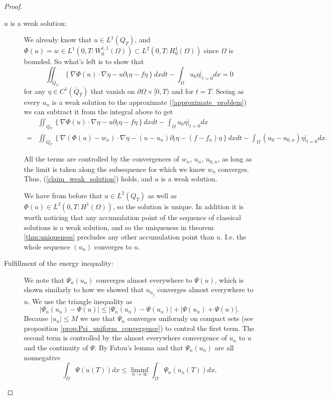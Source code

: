 \documentclass[11pt, a4paper]{article}
\begin{document}
\begin{proof}
\begin{description}
	\item[$u$ is a weak solution:] We already know that $u \in L^1(Q_T)$, and $\Phi(u)=w \in L^1(0,T: W^{1,1}_0(\Omega))\subset L^2(0,T: H^1_0(\Omega))$ since $\Omega$ is bounded. So what's left is to show that
	\begin{equation}
	\label{claim_weak_solution}
	\iint_{Q_T}\left\{ \nabla\Phi(u) \cdot \nabla \eta - u\partial_t \eta - f\eta \right\}dxdt - \int_\Omega u_0\eta\big|_{t=0}dx = 0
	\end{equation}
	for any $\eta \in C^1(\overline{Q}_T)$ that vanish on $\partial \Omega \times [0,T)$ and for $t=T$. Seeing as every $u_n$ is a weak solution to the approximate (\ref{approximate_problem}) we can subtract it from the integral above to get
	\begin{align*}
	&\iint_{Q_T}\left\{ \nabla\Phi(u) \cdot \nabla \eta - u\partial_t \eta - f\eta \right\}dxdt - \int_\Omega u_0\eta\big|_{t=0}dx \\
	= &\iint_{Q_T}\left\{ \nabla(\Phi(u)-w_n) \cdot \nabla \eta - (u-u_n)\partial_t \eta - (f-f_n)\eta \right\}dxdt - \int_\Omega (u_0-u_{0,n})\eta\big|_{t=0}dx.
	\end{align*}
	
	All the terms are controlled by the convergences of $w_n$, $u_n$, $u_{0,n}$, as long as the limit is taken along the subsequence for which we know $w_n$ converges. Thus, (\ref{claim_weak_solution}) holds, and $u$ is a weak solution.
	
	
	We have from before that $u\in L^2(Q_T)$ as well as $\Phi(u) \in L^2(0,T: H^1(\Omega))$, so the solution is unique. In addition it is worth noticing that any accumulation point of the sequence of classical solutions is a weak solution, and so the uniqueness in theorem \ref{thm:uniqueness} precludes any other accumulation point than $u$. I.e. the whole sequence $(u_n)$ converges to $u$.


	\item[Fulfillment of the energy inequality:]
	We note that $\Psi_n(u_n)$ converges almost everywhere to $\Psi(u)$, which is shown similarly to how we showed that $u_{n_j}$ converges almost everywhere to $u$. We use the triangle inequality as
	\begin{equation}
	|\Psi_n(u_n) - \Psi(u)| \leq |\Psi_n(u_n) - \Psi(u_n)| + |\Psi(u_n) + \Psi(u)|.
	\end{equation}
	Because $|u_n| \leq M$ we use that $\Psi_n$ converges uniformly on compact sets (see proposition \ref{prop:Psi_uniform_convergence}) to control the first term. The second term is controlled by the almost everywhere convergence of $u_n$ to $u$ and the continuity of $\Psi$. By Fatou's lemma \citep[p. 162]{weiss1999course} and that $\Psi_n(u_n)$ are all nonnegative
	\begin{equation}
	\int_\Omega \Psi(u(T)) dx \leq \liminf_{n \to \infty} \int_\Omega \Psi_n(u_n(T))dx.
	\end{equation}
	

\end{description}
\end{proof}
\end{document}
